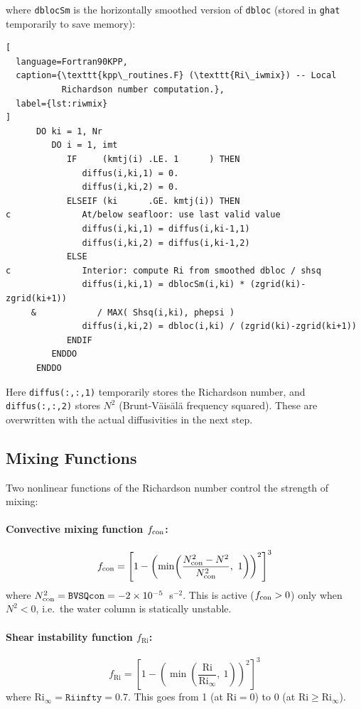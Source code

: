 \documentclass[12pt,letterpaper]{article}
\newcommand{\Ri}{\mathrm{Ri}}
\begin{document}
where \texttt{dblocSm} is the horizontally smoothed version of  
\texttt{dbloc} (stored in \texttt{ghat} temporarily to save memory):  
  
\begin{lstlisting}[  
  language=Fortran90KPP,  
  caption={\texttt{kpp\_routines.F} (\texttt{Ri\_iwmix}) -- Local  
           Richardson number computation.},  
  label={lst:riwmix}  
]  
      DO ki = 1, Nr  
         DO i = 1, imt  
            IF     (kmtj(i) .LE. 1      ) THEN  
               diffus(i,ki,1) = 0.  
               diffus(i,ki,2) = 0.  
            ELSEIF (ki      .GE. kmtj(i)) THEN  
c              At/below seafloor: use last valid value  
               diffus(i,ki,1) = diffus(i,ki-1,1)  
               diffus(i,ki,2) = diffus(i,ki-1,2)  
            ELSE  
c              Interior: compute Ri from smoothed dbloc / shsq  
               diffus(i,ki,1) = dblocSm(i,ki) * (zgrid(ki)-zgrid(ki+1))  
     &            / MAX( Shsq(i,ki), phepsi )  
               diffus(i,ki,2) = dbloc(i,ki) / (zgrid(ki)-zgrid(ki+1))  
            ENDIF  
         ENDDO  
      ENDDO  
\end{lstlisting}  
  
Here \texttt{diffus(:,:,1)} temporarily stores the Richardson number,  
and \texttt{diffus(:,:,2)} stores $N^2$ (Brunt-V\"{a}is\"{a}l\"{a}  
frequency squared). These are overwritten with the actual diffusivities  
in the next step.  
  
\subsection{Mixing Functions}  
  
Two nonlinear functions of the Richardson number control the strength  
of mixing:  
  
\paragraph{Convective mixing function $f_{\rm con}$:}  
\begin{equation}  
f_{\rm con} = \left[1 - \left(\min\!\left(\frac{N^2_{\rm con} - N^2}{N^2_{\rm con}},\  
1\right)\right)^2\right]^3  
\end{equation}  
where $N^2_{\rm con} = \texttt{BVSQcon} = -2\times10^{-5}$~s$^{-2}$.  
This is active ($f_{\rm con} > 0$) only when $N^2 < 0$, i.e.\ the  
water column is statically unstable.  
  
\paragraph{Shear instability function $f_\Ri$:}  
\begin{equation}  
f_\Ri = \left[1 - \left(\min\!\left(\frac{\Ri}{\Ri_\infty},\ 1\right)\right)^2\right]^3  
\end{equation}  
where $\Ri_\infty = \texttt{Riinfty} = 0.7$. This goes from 1 (at  
$\Ri = 0$) to 0 (at $\Ri \geq \Ri_\infty$).  
  
\end{document}
